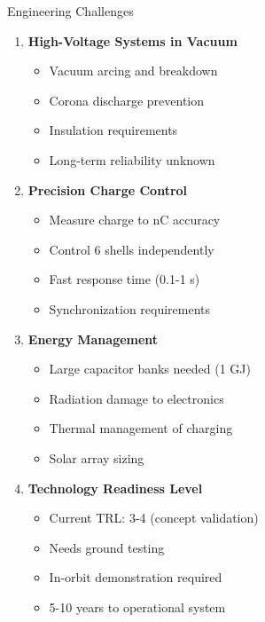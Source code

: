 \documentclass[aspectratio=169]{beamer}
\begin{document}
\begin{frame}{Engineering Challenges}
\begin{enumerate}
    \item \textbf{High-Voltage Systems in Vacuum}
    \begin{itemize}
        \item Vacuum arcing and breakdown
        \item Corona discharge prevention
        \item Insulation requirements
        \item Long-term reliability unknown
    \end{itemize}

    \item \textbf{Precision Charge Control}
    \begin{itemize}
        \item Measure charge to nC accuracy
        \item Control 6 shells independently
        \item Fast response time (0.1-1 s)
        \item Synchronization requirements
    \end{itemize}

    \item \textbf{Energy Management}
    \begin{itemize}
        \item Large capacitor banks needed (1 GJ)
        \item Radiation damage to electronics
        \item Thermal management of charging
        \item Solar array sizing
    \end{itemize}

    \item \textbf{Technology Readiness Level}
    \begin{itemize}
        \item Current TRL: 3-4 (concept validation)
        \item Needs ground testing
        \item In-orbit demonstration required
        \item 5-10 years to operational system
    \end{itemize}
\end{enumerate}
\end{frame}
\end{document}
